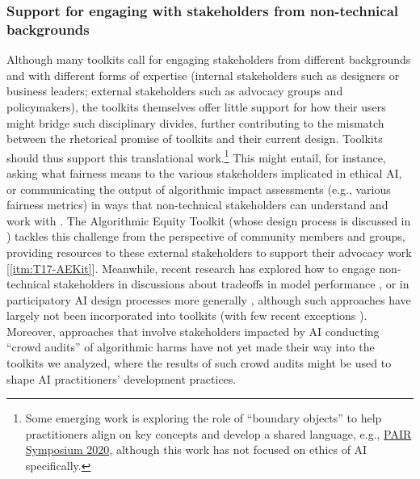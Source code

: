 \documentclass[acmsmall]{acmart}
\begin{document}
\subsubsection{Support for engaging with stakeholders from non-technical backgrounds}
Although many toolkits call for engaging stakeholders from different backgrounds and with different forms of expertise (internal stakeholders such as designers or business leaders; external stakeholders such as advocacy groups and policymakers), the toolkits themselves offer little support for how their users might bridge such disciplinary divides, further contributing to the mismatch between the rhetorical promise of toolkits and their current design. 
Toolkits should thus support this translational work.\footnote{Some emerging work is exploring the role of ``boundary objects'' \cite[cf.][]{star1989structure} to help practitioners align on key concepts and develop a shared language, e.g., \hyperlink{https://events.withgoogle.com/pair-symposium-2020/}{PAIR Symposium 2020}, although this work has not focused on ethics of AI specifically.}
This might entail, for instance, asking what fairness means to the various stakeholders implicated in ethical AI, or communicating the output of algorithmic impact assessments (e.g., various fairness metrics) in ways that non-technical stakeholders can understand and work with \cite{cheng2021soliciting, shen2020designing}. The Algorithmic Equity Toolkit (whose design process is discussed in \cite{10.1145/3442188.3445938}) tackles this challenge from the perspective of community members and groups, providing resources to these external stakeholders to support their advocacy work [\ref{itm:T17-AEKit}]. Meanwhile, recent research has explored how to engage non-technical stakeholders in discussions about tradeoffs in model performance \cite[e.g.,][]{cheng2021soliciting, shen2020designing, shen2021valuecards}, or in participatory AI design processes more generally \cite{delgado2021stakeholder,sloane2020participation}, although such approaches have largely not been incorporated into toolkits (with few recent exceptions \cite[e.g.,][]{shen2022model}). Moreover, approaches that involve stakeholders impacted by AI conducting ``crowd audits'' of algorithmic harms \cite[e.g.,][]{shen2021everyday} have not yet made their way into the toolkits we analyzed, where the results of such crowd audits might be used to shape AI practitioners' development practices. 
\end{document}

